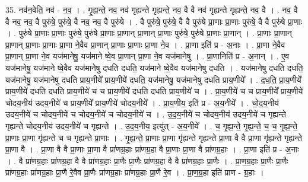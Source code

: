 \documentclass[17pt]{extarticle}
\begin{document}
35. नव॑न॒वेति॒ नव॑ - न॒व॒ । . गृ॒ह्य॒न्ते॒ नव॒ नव॑ गृह्यन्ते गृह्यन्ते॒ नव॒ वै वै नव॑ गृह्यन्ते गृह्यन्ते॒ नव॒ वै । . नव॒ वै वै नव॒ नव॒ वै पुरु॑षे॒ पुरु॑षे॒ वै नव॒ नव॒ वै पुरु॑षे । . वै पुरु॑षे॒ पुरु॑षे॒ वै वै पुरु॑षे प्रा॒णाः प्रा॒णाः पुरु॑षे॒ वै वै पुरु॑षे प्रा॒णाः । . पुरु॑षे प्रा॒णाः प्रा॒णाः पुरु॑षे॒ पुरु॑षे प्रा॒णाः प्रा॒णान् प्रा॒णान् प्रा॒णाः पुरु॑षे॒ पुरु॑षे प्रा॒णाः प्रा॒णान् । . प्रा॒णाः प्रा॒णान् प्रा॒णान् प्रा॒णाः प्रा॒णाः प्रा॒णा ने॒वैव प्रा॒णान् प्रा॒णाः प्रा॒णाः प्रा॒णा ने॒व । . प्रा॒णा इति॑ प्र - अ॒नाः । . प्रा॒णा ने॒वैव प्रा॒णान् प्रा॒णा ने॒व यज॑मानेषु॒ यज॑माने ष्वे॒व प्रा॒णान् प्रा॒णा ने॒व यज॑मानेषु । . प्रा॒णानिति॑ प्र - अ॒नान् । . ए॒व यज॑मानेषु॒ यज॑माने ष्वे॒वैव यज॑मानेषु दधति दधति॒ यज॑माने ष्वे॒वैव यज॑मानेषु दधति । . यज॑मानेषु दधति दधति॒ यज॑मानेषु॒ यज॑मानेषु दधति प्राय॒णीये᳚ प्राय॒णीये॑ दधति॒ यज॑मानेषु॒ यज॑मानेषु दधति प्राय॒णीये᳚ । . द॒ध॒ति॒ प्रा॒य॒णीये᳚ प्राय॒णीये॑ दधति दधति प्राय॒णीये॑ च च प्राय॒णीये॑ दधति दधति प्राय॒णीये॑ च । . प्रा॒य॒णीये॑ च च प्राय॒णीये᳚ प्राय॒णीये॑ चोदय॒नीय॑ उदय॒नीये॑ च प्राय॒णीये᳚ प्राय॒णीये॑ चोदय॒नीये᳚ । . प्रा॒य॒णीय॒ इति॑ प्र - अ॒य॒नीये᳚ । . चो॒द॒य॒नीय॑ उदय॒नीये॑ च चोदय॒नीये॑ च चोदय॒नीये॑ च चोदय॒नीये॑ च । . उ॒द॒य॒नीये॑ च चोदय॒नीय॑ उदय॒नीये॑ च गृह्यन्ते गृह्यन्ते चोदय॒नीय॑ उदय॒नीये॑ च गृह्यन्ते । . उ॒द॒य॒नीय॒ इत्यु॑त् - अ॒य॒नीये᳚ । . च॒ गृ॒ह्य॒न्ते॒ गृ॒ह्य॒न्ते॒ च॒ च॒ गृ॒ह्य॒न्ते॒ प्रा॒णाः प्रा॒णा गृ॑ह्यन्ते च च गृह्यन्ते प्रा॒णाः । . गृ॒ह्य॒न्ते॒ प्रा॒णाः प्रा॒णा गृ॑ह्यन्ते गृह्यन्ते प्रा॒णा वै वै प्रा॒णा गृ॑ह्यन्ते गृह्यन्ते प्रा॒णा वै । . प्रा॒णा वै वै प्रा॒णाः प्रा॒णा वै प्रा॑णग्र॒हाः प्रा॑णग्र॒हा वै प्रा॒णाः प्रा॒णा वै प्रा॑णग्र॒हाः । . प्रा॒णा इति॑ प्र - अ॒नाः । . वै प्रा॑णग्र॒हाः प्रा॑णग्र॒हा वै वै प्रा॑णग्र॒हाः प्रा॒णैः प्रा॒णैः प्रा॑णग्र॒हा वै वै प्रा॑णग्र॒हाः प्रा॒णैः । . प्रा॒ण॒ग्र॒हाः प्रा॒णैः प्रा॒णैः प्रा॑णग्र॒हाः प्रा॑णग्र॒हाः प्रा॒णै रे॒वैव प्रा॒णैः प्रा॑णग्र॒हाः प्रा॑णग्र॒हाः प्रा॒णै रे॒व । . प्रा॒ण॒ग्र॒हा इति॑ प्राण - ग्र॒हाः । \newline
\pagebreak
{}
\end{document}
